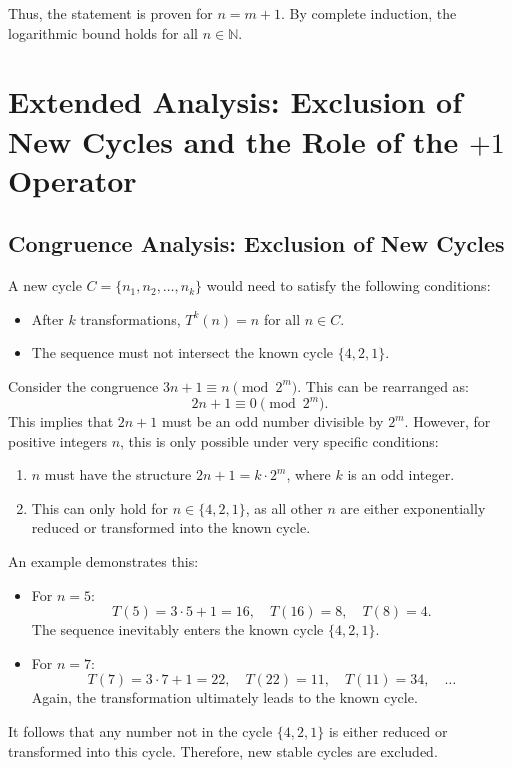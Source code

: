 \documentclass[a4paper,12pt]{article}
\begin{document}
Thus, the statement is proven for \( n = m + 1 \). By complete induction, the logarithmic bound holds for all \( n \in \mathbb{N} \).

\section{Extended Analysis: Exclusion of New Cycles and the Role of the \(+1\) Operator}

\subsection{Congruence Analysis: Exclusion of New Cycles}
A new cycle \( C = \{n_1, n_2, \dots, n_k\} \) would need to satisfy the following conditions:
\begin{itemize}
    \item After \( k \) transformations, \( T^k(n) = n \) for all \( n \in C \).
    \item The sequence must not intersect the known cycle \( \{4, 2, 1\} \).
\end{itemize}

Consider the congruence \( 3n + 1 \equiv n \pmod{2^m} \). This can be rearranged as:
\[
2n + 1 \equiv 0 \pmod{2^m}.
\]
This implies that \( 2n + 1 \) must be an odd number divisible by \( 2^m \). However, for positive integers \( n \), this is only possible under very specific conditions:
\begin{enumerate}
    \item \( n \) must have the structure \( 2n + 1 = k \cdot 2^m \), where \( k \) is an odd integer.
    \item This can only hold for \( n \in \{4, 2, 1\} \), as all other \( n \) are either exponentially reduced or transformed into the known cycle.
\end{enumerate}

An example demonstrates this:
\begin{itemize}
    \item For \( n = 5 \): 
    \[
    T(5) = 3 \cdot 5 + 1 = 16, \quad T(16) = 8, \quad T(8) = 4.
    \]
    The sequence inevitably enters the known cycle \( \{4, 2, 1\} \).
    \item For \( n = 7 \): 
    \[
    T(7) = 3 \cdot 7 + 1 = 22, \quad T(22) = 11, \quad T(11) = 34, \quad \dots
    \]
    Again, the transformation ultimately leads to the known cycle.
\end{itemize}

It follows that any number not in the cycle \( \{4, 2, 1\} \) is either reduced or transformed into this cycle. Therefore, new stable cycles are excluded.
\end{document}
